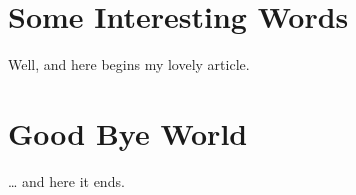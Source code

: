 \documentclass[a4paper,11pt]{report}
\begin{document}
	\mbox{}
	\thispagestyle{empty}
	\newpage	
	
	\tableofcontents
	\newpage
	
	\newpage
	\newpage
\section{Some Interesting Words}
	Well, and here begins my lovely article.

\section{Good Bye World}
	\ldots{} and here it ends.

\end{document}
